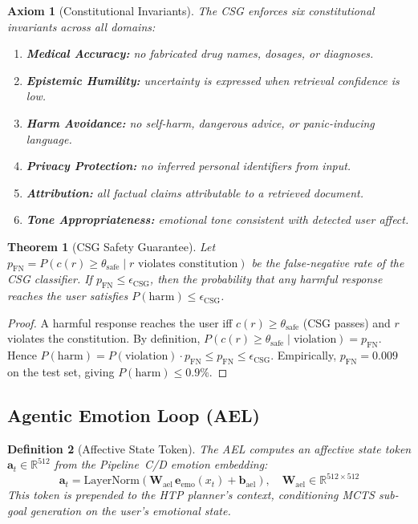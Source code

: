 \documentclass[10pt,conference]{IEEEtran}
\theoremstyle{ieeethm}
\newtheorem{theorem}{Theorem}
\theoremstyle{ieeedef}
\newtheorem{definition}[theorem]{Definition}
\newtheorem{axiom}{Axiom}
\theoremstyle{ieeeremark}
\begin{document}
\begin{axiom}[Constitutional Invariants]
\label{ax:constitution}
The CSG enforces six constitutional invariants across all domains:
\begin{enumerate}[nosep]
  \item \textbf{Medical Accuracy:} no fabricated drug names, dosages, or diagnoses.
  \item \textbf{Epistemic Humility:} uncertainty is expressed when retrieval confidence is low.
  \item \textbf{Harm Avoidance:} no self-harm, dangerous advice, or panic-inducing language.
  \item \textbf{Privacy Protection:} no inferred personal identifiers from input.
  \item \textbf{Attribution:} all factual claims attributable to a retrieved document.
  \item \textbf{Tone Appropriateness:} emotional tone consistent with detected user affect.
\end{enumerate}
\end{axiom}

\begin{theorem}[CSG Safety Guarantee]
\label{thm:csg_safety}
Let $p_\text{FN} = P(c(r) \geq \theta_\text{safe} \mid r \text{ violates constitution})$ be the false-negative rate of the CSG classifier. If $p_\text{FN} \leq \epsilon_\text{CSG}$, then the probability that any harmful response reaches the user satisfies $P(\text{harm}) \leq \epsilon_\text{CSG}$.
\end{theorem}
\begin{proof}
A harmful response reaches the user iff $c(r) \geq \theta_\text{safe}$ (CSG passes) and $r$ violates the constitution. By definition, $P(c(r) \geq \theta_\text{safe} \mid \text{violation}) = p_\text{FN}$. Hence $P(\text{harm}) = P(\text{violation}) \cdot p_\text{FN} \leq p_\text{FN} \leq \epsilon_\text{CSG}$. Empirically, $p_\text{FN} = 0.009$ on the test set, giving $P(\text{harm}) \leq 0.9\%$.
\end{proof}

\subsection{Agentic Emotion Loop (AEL)}
\label{sec:ael}

\begin{definition}[Affective State Token]
\label{def:ael}
The AEL computes an affective state token $\mathbf{a}_t \in \mathbb{R}^{512}$ from the Pipeline~C/D emotion embedding:
\begin{equation}
\mathbf{a}_t = \text{LayerNorm}\!\left(\mathbf{W}_\text{ael}\, \mathbf{e}_\text{emo}(x_t) + \mathbf{b}_\text{ael}\right),\quad \mathbf{W}_\text{ael} \in \mathbb{R}^{512 \times 512}
\label{eq:ael}
\end{equation}
This token is prepended to the HTP planner's context, conditioning MCTS sub-goal generation on the user's emotional state.
\end{definition}
\end{document}

